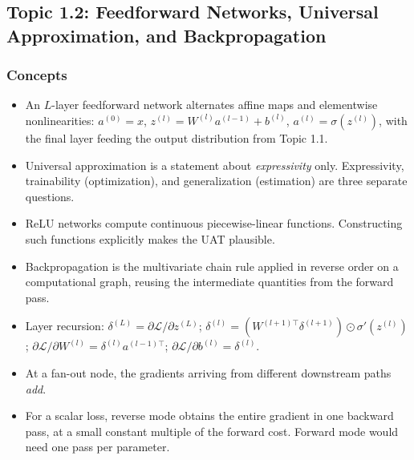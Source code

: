 \documentclass[11pt]{article}
\begin{document}
\subsection{Topic 1.2: Feedforward Networks, Universal Approximation, and Backpropagation}

\subsubsection*{Concepts}
\begin{itemize}
  \item An $L$-layer feedforward network alternates affine maps and elementwise nonlinearities: $a^{(0)} = x$, $z^{(l)} = W^{(l)} a^{(l-1)} + b^{(l)}$, $a^{(l)} = \sigma(z^{(l)})$, with the final layer feeding the output distribution from Topic 1.1.
  \item Universal approximation is a statement about \emph{expressivity} only. Expressivity, trainability (optimization), and generalization (estimation) are three separate questions.
  \item ReLU networks compute continuous piecewise-linear functions. Constructing such functions explicitly makes the UAT plausible.
  \item Backpropagation is the multivariate chain rule applied in reverse order on a computational graph, reusing the intermediate quantities from the forward pass.
  \item Layer recursion: $\delta^{(L)} = \partial\mathcal L/\partial z^{(L)}$; $\delta^{(l)} = (W^{(l+1)\top}\delta^{(l+1)}) \odot \sigma'(z^{(l)})$; $\partial\mathcal L/\partial W^{(l)} = \delta^{(l)} a^{(l-1)\top}$; $\partial\mathcal L/\partial b^{(l)} = \delta^{(l)}$.
  \item At a fan-out node, the gradients arriving from different downstream paths \emph{add}.
  \item For a scalar loss, reverse mode obtains the entire gradient in one backward pass, at a small constant multiple of the forward cost. Forward mode would need one pass per parameter.
\end{itemize}
\end{document}
